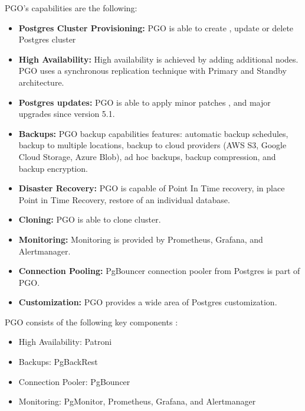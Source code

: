 PGO’s capabilities are the following:
\begin{itemize}
  \item \textbf{Postgres Cluster Provisioning:} PGO is able to create \cite{CrunchyDocCreate}, update \cite{CrunchyDocUpdate} or delete Postgres cluster \cite{CrunchyDocDelete}
  \item \textbf{High Availability:} High availability is achieved by adding additional nodes. PGO uses a synchronous replication technique with Primary and Standby architecture. \cite{CrunchyDocHA}
  \item \textbf{Postgres updates:} PGO is able to apply minor patches \cite{CrunchyDocMinorUpdates}, and major upgrades since version 5.1. \cite{CrunchyBlogUpdates}
  \item \textbf{Backups:} PGO backup capabilities features: automatic backup schedules, backup to multiple locations, backup to cloud providers (AWS S3, Google Cloud Storage, Azure Blob), ad hoc backups, backup compression, and backup encryption. \cite{CrunchyDocBackups}
  \item \textbf{Disaster Recovery:} PGO is capable of Point In Time recovery, in place Point in Time Recovery, restore of an individual database. \cite{CrunchyDocDisasterRecovery}
  \item \textbf{Cloning:} PGO is able to clone cluster. \cite{CrunchyDocDisasterRecovery}
  \item \textbf{Monitoring:} Monitoring is provided by Prometheus, Grafana, and Alertmanager. \cite{CrunchyDocMonitoring}
  \item \textbf{Connection Pooling:} PgBouncer connection pooler from Postgres is part of PGO. \cite{CrunchyDocConnectionPooling}
  \item  \textbf{Customization:} PGO provides a wide area of Postgres customization. \cite{CrunchyDocCustomisation}
\end{itemize}


PGO consists of the following key components \cite{CrunchyPGOGit}:
\begin{itemize}
  \item High Availability: Patroni
  \item Backups: PgBackRest
  \item Connection Pooler: PgBouncer
  \item Monitoring: PgMonitor, Prometheus, Grafana, and Alertmanager
\end{itemize}

